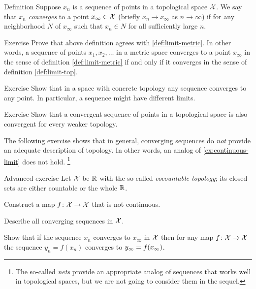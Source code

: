 \begin{thm}{Definition}\label{def:limit-top}
Suppose $x_n$ is a sequence of points in a topological space $\mathcal{X}$.
We say that $x_n$ \emph{converges} to a point $x_\infty\in \mathcal{X}$ (briefly $x_n\to x_\infty$ as $n\to\infty$) if for any neighborhood $N$ of $x_\infty$ such that 
$x_n\in N$ for all sufficiently large $n$.
\end{thm}

\begin{thm}{Exercise}\label{ex:def:limit-metric=def:limit-top}
Prove that above definition agrees with \ref{def:limit-metric}.
In other words, a sequence of points $x_1,x_2,\dots$ in a metric space converges to a point $x_\infty$ in the sense of definition \ref{def:limit-metric} if and only if it converges in the sense of definition \ref{def:limit-top}.
\end{thm}

\begin{thm}{Exercise}\label{ex:concrete-lim}
Show that in a space with concrete topology any sequence converges to any point.
In particular, a sequence might have different limits.
\end{thm}

\begin{thm}{Exercise}\label{ex:lim-weaker}
Show that a convergent sequence of points in a topological space is also convergent for every weaker topology.
\end{thm}

The following exercise shows that in general, converging sequences do \textit{not} provide an adequate description of topology.
In other words, an analog of \ref{ex:continuous-limit} does not hold.%
\footnote{The so-called \emph{nets} provide an appropriate analog of sequences that works well in topological spaces, but we are not going to consider them in the sequel.}

\begin{thm}{Advanced exercise}\label{ex:cocountable-top}
Let $\mathcal{X}$ be $\mathbb{R}$ with the so-called \emph{cocountable topology};
its closed sets are either countable or the whole $\mathbb{R}$.

\begin{subthm}{}
 Construct a map $f\colon\mathcal{X}\to \mathcal{X}$ that is not continuous.
\end{subthm}

\begin{subthm}{}
 Describe all converging sequences in $\mathcal{X}$.
\end{subthm}

\begin{subthm}{}
 Show that if the sequence $x_n$ converges to $x_\infty$ in $\mathcal{X}$ then for any map $f\colon\mathcal{X}\to \mathcal{X}$ the sequence $y_n=f(x_n)$ converges to $y_\infty\z=f(x_\infty)$.
\end{subthm}

\end{thm}
